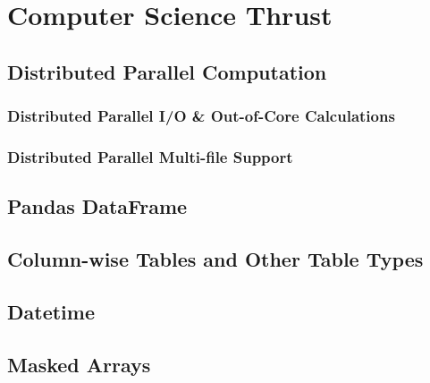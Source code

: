 \section{Computer Science Thrust}

\subsection{Distributed Parallel Computation}

\subsubsection{Distributed Parallel I/O \& Out-of-Core Calculations}

\subsubsection{Distributed Parallel Multi-file Support}

\subsection{Pandas DataFrame}

\subsection{Column-wise Tables and Other Table Types}

\subsection{Datetime}

\subsection{Masked Arrays}
